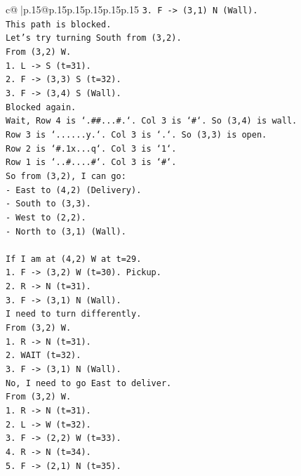 \documentclass{article}
\begin{document}
{\begin{supertabular}{c@{$\;$}|p{.15\linewidth}@{}p{.15\linewidth}p{.15\linewidth}p{.15\linewidth}p{.15\linewidth}p{.15\linewidth}}
{{{\texttt{3. F {-}> (3,1) N (Wall).} \\
\texttt{This path is blocked.} \\
\texttt{Let's try turning South from (3,2).} \\
\texttt{From (3,2) W.} \\
\texttt{1. L {-}> S (t=31).} \\
\texttt{2. F {-}> (3,3) S (t=32).} \\
\texttt{3. F {-}> (3,4) S (Wall).} \\
\texttt{Blocked again.} \\
\texttt{Wait, Row 4 is `.\#\#...\#.`. Col 3 is `\#`. So (3,4) is wall.} \\
\texttt{Row 3 is `......y.`. Col 3 is `.`. So (3,3) is open.} \\
\texttt{Row 2 is `\#.1x...q`. Col 3 is `1`.} \\
\texttt{Row 1 is `..\#....\#`. Col 3 is `\#`.} \\
\texttt{So from (3,2), I can go:} \\
\texttt{{-} East to (4,2) (Delivery).} \\
\texttt{{-} South to (3,3).} \\
\texttt{{-} West to (2,2).} \\
\texttt{{-} North to (3,1) (Wall).} \\
\\ 
\texttt{If I am at (4,2) W at t=29.} \\
\texttt{1. F {-}> (3,2) W (t=30). Pickup.} \\
\texttt{2. R {-}> N (t=31).} \\
\texttt{3. F {-}> (3,1) N (Wall).} \\
\texttt{I need to turn differently.} \\
\texttt{From (3,2) W.} \\
\texttt{1. R {-}> N (t=31).} \\
\texttt{2. WAIT (t=32).} \\
\texttt{3. F {-}> (3,1) N (Wall).} \\
\texttt{No, I need to go East to deliver.} \\
\texttt{From (3,2) W.} \\
\texttt{1. R {-}> N (t=31).} \\
\texttt{2. L {-}> W (t=32).} \\
\texttt{3. F {-}> (2,2) W (t=33).} \\
\texttt{4. R {-}> N (t=34).} \\
\texttt{5. F {-}> (2,1) N (t=35).} \\
}}}
\end{supertabular}}
\end{document}
